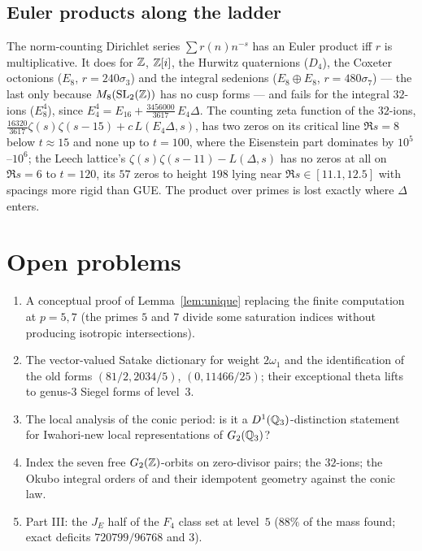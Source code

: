\documentclass[11pt]{amsart}
\theoremstyle{definition}
\begin{document}
\subsection{Euler products along the ladder}
The norm-counting Dirichlet series $\sum r(n)n^{-s}$ has an Euler product iff $r$ is multiplicative. It does for $\mathbb{Z}$, $\mathbb{Z}[i]$, the Hurwitz quaternions ($D_4$), the Coxeter octonions ($E_8$, $r=240\sigma_3$) and the integral sedenions ($E_8\oplus E_8$, $r=480\sigma_7$) --- the last only because $M_8(\mathrm{SL}_2(\mathbb{Z}))$ has no cusp forms --- and fails for the integral $32$-ions ($E_8^4$), since $E_4^4=E_{16}+\tfrac{3456000}{3617}\,E_4\Delta$. The counting zeta function of the $32$-ions, $\tfrac{16320}{3617}\zeta(s)\zeta(s-15)+c\,L(E_4\Delta,s)$, has two zeros on its critical line $\Re s=8$ below $t\approx 15$ and none up to $t=100$, where the Eisenstein part dominates by $10^5$--$10^6$; the Leech lattice's $\zeta(s)\zeta(s-11)-L(\Delta,s)$ has no zeros at all on $\Re s=6$ to $t=120$, its $57$ zeros to height $198$ lying near $\Re s\in[11.1,12.5]$ with spacings more rigid than GUE. The product over primes is lost exactly where $\Delta$ enters.

\section{Open problems}
\begin{enumerate}[leftmargin=2em]
\item A conceptual proof of Lemma~\ref{lem:unique} replacing the finite computation at $p=5,7$ (the primes $5$ and $7$ divide some saturation indices without producing isotropic intersections).
\item The vector-valued Satake dictionary for weight $2\omega_1$ and the identification of the old forms $(81/2,2034/5)$, $(0,11466/25)$; their exceptional theta lifts to genus-$3$ Siegel forms of level~$3$.
\item The local analysis of the conic period: is it a $D^1(\mathbb{Q}_3)$-distinction statement for Iwahori-new local representations of $G_2(\mathbb{Q}_3)$?
\item Index the seven free $G_2(\mathbb{Z})$-orbits on zero-divisor pairs; the $32$-ions; the Okubo integral orders of \cite{Corr26} and their idempotent geometry against the conic law.
\item Part III: the $J_E$ half of the $F_4$ class set at level~$5$ ($88\%$ of the mass found; exact deficits $720799/96768$ and $3$).
\end{enumerate}
\end{document}
